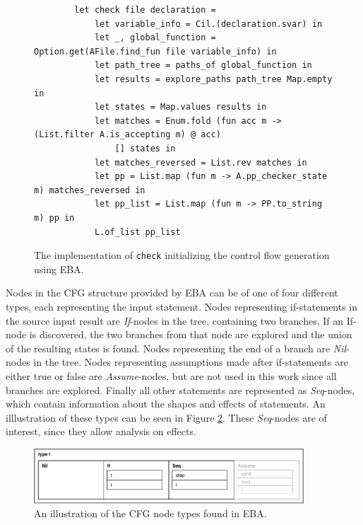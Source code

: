 \begin{figure}[H]
    \centering
    \begin{verbatim}
        let check file declaration =
            let variable_info = Cil.(declaration.svar) in
            let _, global_function = Option.get(AFile.find_fun file variable_info) in
            let path_tree = paths_of global_function in
            let results = explore_paths path_tree Map.empty in 
            let states = Map.values results in
            let matches = Enum.fold (fun acc m -> (List.filter A.is_accepting m) @ acc) 
                [] states in
            let matches_reversed = List.rev matches in 
            let pp = List.map (fun m -> A.pp_checker_state m) matches_reversed in
            let pp_list = List.map (fun m -> PP.to_string m) pp in
            L.of_list pp_list
    \end{verbatim}
    \caption{The implementation of \texttt{check} initializing the control flow generation using EBA.}
    \label{check-implementation}
\end{figure}

\noindent Nodes in the CFG structure provided by EBA can be of one of four different types, each representing the input statement. Nodes representing if-statements in the source input result are \textit{If}-nodes in the tree, containing two branches. If an If-node is discovered, the two branches from that node are explored and the union of the resulting states is found. Nodes representing the end of a branch are \textit{Nil}-nodes in the tree. Nodes representing assumptions made after if-statements are either true or false are \textit{Assume}-nodes, but are not used in this work since all branches are explored. Finally all other statements are represented as \textit{Seq}-nodes, which contain information about the shapes and effects of statements. An illlustration of these types can be seen in Figure \ref{cfg-nodes}. These \textit{Seq}-nodes are of interest, since they allow analysis on effects.  

\begin{figure}[H]
    \centering
    \includegraphics[width=0.9\textwidth]{implementation/figures/node}
    \caption{An illustration of the CFG node types found in EBA.}
    \label{cfg-nodes}
\end{figure}

